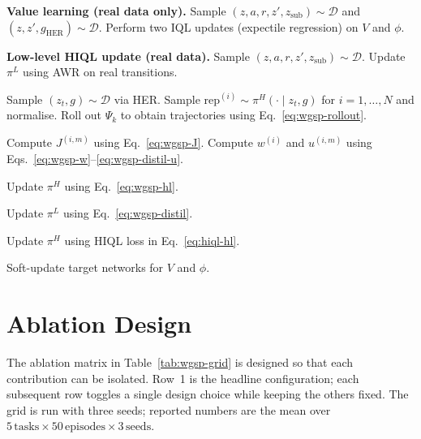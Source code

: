 \begin{algorithm}[t]
\caption{WGSP training step (single iteration of \texttt{train\_hiql\_wgsp.py})}
\label{alg:wgsp}
\begin{algorithmic}[1]

\State \textbf{Value learning (real data only).}
Sample $(z,a,r,z',z_\text{sub}) \sim \mathcal{D}$ and
$(z,z',g_\text{HER}) \sim \mathcal{D}$.
Perform two IQL updates (expectile regression) on $V$ and $\phi$.

\State \textbf{Low-level HIQL update (real data).}
Sample $(z,a,r,z',z_\text{sub}) \sim \mathcal{D}$.
Update $\pi^L$ using AWR on real transitions.


    \State Sample $(z_t,g) \sim \mathcal{D}$ via HER.
    \State Sample $\text{rep}^{(i)} \sim \pi^H(\cdot \mid z_t, g)$ for $i=1,\dots,N$ and normalise.
    \State Roll out $\Psi_k$ to obtain trajectories using Eq.~\eqref{eq:wgsp-rollout}.

    \State Compute $J^{(i,m)}$ using Eq.~\eqref{eq:wgsp-J}.
    \State Compute $w^{(i)}$ and $u^{(i,m)}$ using
    Eqs.~\eqref{eq:wgsp-w}--\eqref{eq:wgsp-distil-u}.

    \State Update $\pi^H$ using Eq.~\eqref{eq:wgsp-hl}.

        \State Update $\pi^L$ using Eq.~\eqref{eq:wgsp-distil}.
    \EndIf

\Else
    \State Update $\pi^H$ using HIQL loss in Eq.~\eqref{eq:hiql-hl}.
\EndIf

\State Soft-update target networks for $V$ and $\phi$.

\end{algorithmic}
\end{algorithm}

\section{Ablation Design}
\label{sec:wgsp:ablations}

The ablation matrix in Table~\ref{tab:wgsp-grid} is designed so that
each contribution can be isolated. Row~1 is the headline configuration;
each subsequent row toggles a single design choice while keeping the
others fixed. The grid is run with three seeds; reported numbers are
the mean over $5\,\text{tasks}\times 50\,\text{episodes}\times 3\,\text{seeds}$.

